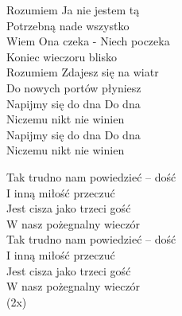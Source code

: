 \begin{text}
Rozumiem Ja nie jestem tą \\
Potrzebną nade wszystko \\
Wiem Ona czeka - Niech poczeka \\
Koniec wieczoru blisko \\
Rozumiem Zdajesz się na wiatr \\
Do nowych portów płyniesz \\
Napijmy się do dna Do dna \\
Niczemu nikt nie winien \\
Napijmy się do dna Do dna\\
Niczemu nikt nie winien

\vin Tak trudno nam powiedzieć – dość \\
\vin I inną miłość przeczuć \\
\vin Jest cisza jako trzeci gość \\
\vin W nasz pożegnalny wieczór \\
\vin Tak trudno nam powiedzieć – dość \\
\vin I inną miłość przeczuć \\
\vin Jest cisza jako trzeci gość \\
\vin W nasz pożegnalny wieczór \\
\vin (2x)\\
~
\end{text}
